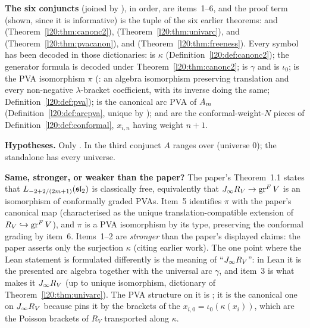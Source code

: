 \begin{dictionary}
\textbf{The six conjuncts} (joined by ), in order, are items~1--6, and the proof term (shown, since it is informative)
is the tuple of the six earlier theorems:  and 
(Theorem~\ref{l20:thm:canonc2}),  (Theorem~\ref{l20:thm:univarc}), 
and  (Theorem~\ref{l20:thm:pvacanon}), and 
(Theorem~\ref{l20:thm:freeness}). Every symbol has been decoded in those dictionaries:  is $\kappa$
(Definition~\ref{l20:def:canonc2}); the generator formula is decoded under Theorem~\ref{l20:thm:canonc2};
 is $\gamma$ and  is $\iota_0$;  is the PVA isomorphism $\pi$
(: an algebra isomorphism preserving translation and every non-negative $\lambda$-bracket
coefficient, with its inverse doing the same; Definition~\ref{l20:def:pva});  is the canonical arc PVA of
$A_m$ (Definition~\ref{l20:def:arcpva}, unique by );  and
 are the conformal-weight-$N$ pieces of Definition~\ref{l20:def:conformal}, $x_{i,n}$ having weight
$n+1$.

\textbf{Hypotheses.} Only . In the third conjunct $A$ ranges over  (universe $0$); the
standalone  has every universe.

\textbf{Same, stronger, or weaker than the paper?} The paper's Theorem~1.1 states that $L_{-2+2/(2m+1)}(\mathfrak{sl}_2)$ is
classically free, equivalently that $J_\infty R_V\to\operatorname{gr}^F V$ is an isomorphism of conformally graded PVAs. Item~5 identifies $\pi$ with the
paper's canonical map (characterised as the unique translation-compatible extension of $R_V\hookrightarrow\operatorname{gr}^F V$), and
$\pi$ is a PVA isomorphism by its type, preserving the conformal grading by item~6. Items~1--2 are \emph{stronger} than the
paper's displayed claims: the paper asserts only the surjection $\kappa$ (citing earlier work). The one point where the Lean
statement is formulated differently is the meaning of ``$J_\infty R_V$'': in Lean it is the presented arc algebra together with
the universal arc $\gamma$, and item~3 is what makes it $J_\infty R_V$ (up to unique isomorphism, dictionary of
Theorem~\ref{l20:thm:univarc}). The PVA structure on it is ; it is the canonical one on $J_\infty R_V$ because
 pins it by the brackets of the $x_{i,0}=\iota_0(\kappa(x_i))$, which are the Poisson brackets of $R_V$
transported along $\kappa$.


\end{dictionary}
